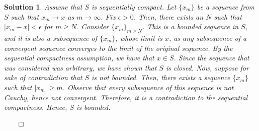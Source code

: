 \documentclass{article} %
\theoremstyle{quest}
\newtheorem*{solution}{Solution}
\begin{document}
\begin{solution}
\smallskip

Assume that $S$ is sequentially compact. Let $\{ x_m \}$ be a sequence from $S$ such that $x_m \to
x$ as $m \to \infty$. Fix $\epsilon > 0$. Then, there exists an $N$ such that $|x_m - x| < \epsilon$
for $m \geq N$. Consider $\{x_m \}_{m \geq N}$. This is a bounded sequence in $S$, and it is also
a subsequence of $\{x_m\}$, whose limit is $x$, as any subsequence of a convergent sequence 
converges to the limit of the original sequence. By the sequential compactness assumption, we have that
$x \in S$. Since the sequence that was considered was arbitrary, we have shown that $S$ is closed. Now,
suppose for sake of contradiction that $S$ is not bounded. Then, there exists a sequence $\{x_m \}$
such that $|x_m| \geq m$. Observe that every subsequence of this sequence is not Cauchy, hence
not convergent. Therefore, it is a contradiction to the sequential compactness. Hence, $S$
is bounded.

\hfill $\qed$
 

\end{solution}

\newpage
\end{document}
